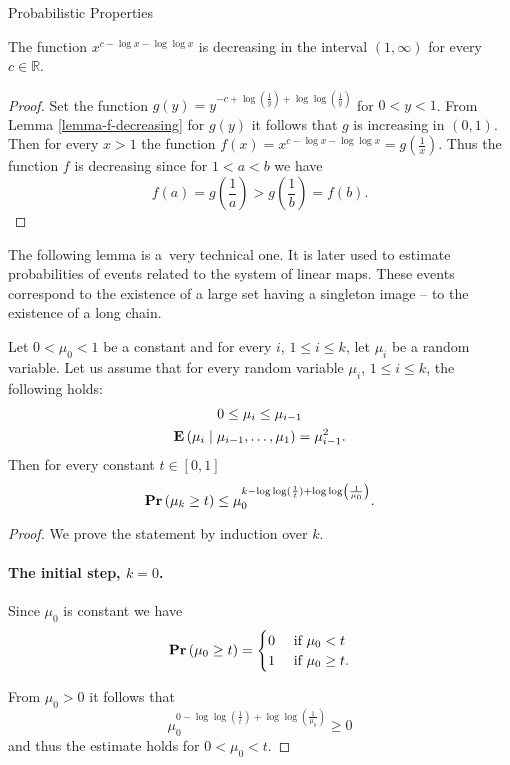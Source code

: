\begin{section}{Probabilistic Properties}
\begin{corollary}
\label{corollary-f1}
The function $x ^ {c - \log x - \log \log x}$ is decreasing in the interval $(1, \infty)$ for every $c \in \mathbb{R}$.
\end{corollary}
\begin{proof}
Set the function $g(y) = y ^ {-c + \log \left(\frac{1}{y}\right) + \log \log \left(\frac{1}{y}\right)}$ for $0 < y < 1$. From Lemma \ref{lemma-f-decreasing} for $g(y)$ it follows that $g$ is increasing in $(0, 1)$. Then for every $x > 1$ the function $f(x) = x ^ {c - \log x - \log \log x} = g\left(\frac{1}{x}\right)$. Thus the function $f$ is decreasing since for $1 < a < b$ we have
\[
	f(a) = g\left(\frac{1}{a}\right) > g\left(\frac{1}{b}\right) = f(b) \text{.}
\] 
\end{proof}

The following lemma is a~very technical one. It is later used to estimate probabilities of events related to the system of linear maps. These events correspond to the existence of a large set having a singleton image -- to the existence of a long chain.
\begin{lemma}
\label{lemma-random-variable}
Let $0 < \mu_0 < 1$ be a constant and for every $i$, $1 \leq i \leq k$, let $\mu_i$ be a random variable. Let us assume that for every random variable $\mu_i$, $1 \leq i \leq k$, the following holds:
\begin{gather*}
0 \leq \mu_i \leq \mu_{i - 1} \\
\mathbf{E}\left( \mu_i \mid \mu_{i-1}, \dots, \mu_1 \right) = \mu_{i-1}^{2} \text{.}
\end{gather*}
Then for every constant $t \in \left[0, 1 \right]$ \[ \mathbf{Pr}\left(\mu_k \geq t\right) \leq \mu_0^{k - \log \log (\frac{1}{t}) + \log \log \left(\frac{1}{\mu_0}\right)} \text{.} \]
\end{lemma}
\begin{proof}
We prove the statement by induction over $k$. 

\paragraph*{The initial step, $k = 0$.}
Since $\mu_0$ is constant we have
\[
	\mathbf{Pr}\left(\mu_0 \geq t\right) = \begin{cases}
		0 & \text{ if } \mu_0 < t \\
		1 & \text{ if } \mu_0 \geq t \text{.} \\
	\end{cases}
\]

From $\mu_0 > 0$ it follows that
\[
	\mu_0^{0 - \log \log \left(\frac{1}{t}\right) + \log \log \left(\frac{1}{\mu_0}\right)} \geq 0
\]
and thus the estimate holds for $0 < \mu_0 < t$.


\end{proof}
\end{section}
